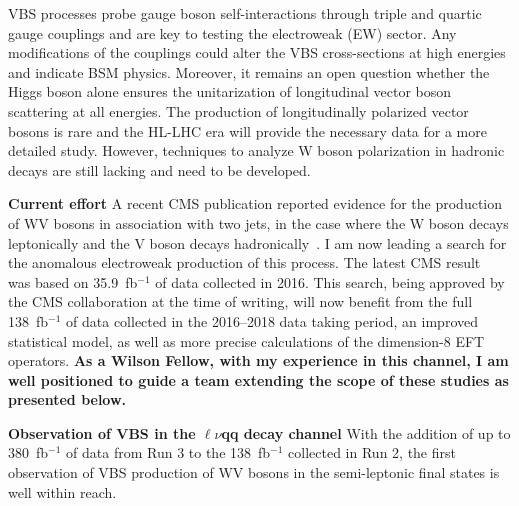 {\begin{flushleft}
VBS processes probe gauge boson self-interactions through triple and quartic gauge couplings and are key to testing the electroweak (EW) sector. Any modifications of the couplings could alter the VBS cross-sections at high energies and indicate BSM physics.  
Moreover, it remains an open question whether the Higgs boson alone ensures the unitarization of longitudinal vector boson scattering at all energies. The production of longitudinally polarized vector bosons is rare and the HL-LHC era will provide the necessary data for a more detailed study. However, techniques to analyze W boson polarization in hadronic decays are still lacking and need to be developed.

\textbf{Current effort}
A recent CMS publication reported evidence for the production of WV bosons in association with two jets, in the case where the W boson decays leptonically and the V boson decays hadronically~\cite{[2]}. I am now leading a search for the anomalous electroweak production of this process. The latest CMS result~\cite{[3]} was based on 35.9~fb$^{-1}$ of data collected in 2016. This search, being approved by the CMS collaboration at the time of writing, will now benefit from the full 138~fb$^{-1}$ of data collected in the 2016--2018 data taking period, an improved statistical model, as well as more precise calculations of the dimension-8 EFT operators. {\bf As a Wilson Fellow, with my experience in this channel, I am well positioned to guide a team extending the scope of these studies as presented below.}

\textbf{Observation of VBS in the $\ell\nu$qq decay channel} With the addition of up to 380~fb$^{-1}$ of data from Run 3 to the 138~fb$^{-1}$ collected in Run 2, the first observation of VBS production of WV bosons in the semi-leptonic final states is well within reach.


\end{flushleft}}
